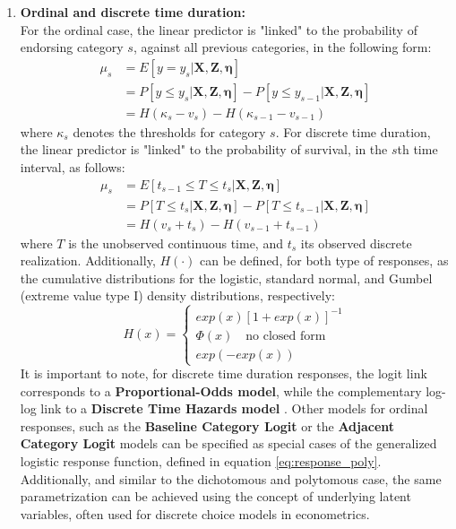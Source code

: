 \begin{enumerate}
	\item \textbf{Ordinal and discrete time duration:} \\
	For the ordinal case, the linear predictor is "linked" to the probability of endorsing category $s$, against all previous categories, in the following form:
	\begin{equation} \label{eq:link_ord1}
		\begin{split}
			\mu_{s} &= E[y = y_{s} | \mathbf{X}, \mathbf{Z}, \pmb{\eta}] \\
			&= P[y \leq y_{s} | \mathbf{X}, \mathbf{Z}, \pmb{\eta}] - P[y \leq y_{s-1} | \mathbf{X}, \mathbf{Z}, \pmb{\eta}] \\
			&= H(\kappa_{s} - v_{s}) - H(\kappa_{s-1} - v_{s-1})
		\end{split}
	\end{equation}
	where $\kappa_{s}$ denotes the thresholds for category $s$. For discrete time duration, the linear predictor is "linked" to the probability of survival, in the $s$th time interval, as follows:
	\begin{equation} \label{eq:link_ord2}
		\begin{split}
			\mu_{s} &= E[t_{s-1} \leq T \le t_{s} | \mathbf{X}, \mathbf{Z}, \pmb{\eta}] \\
			&= P[T \leq t_{s} | \mathbf{X}, \mathbf{Z}, \pmb{\eta}] - P[T \leq t_{s-1} | \mathbf{X}, \mathbf{Z}, \pmb{\eta}] \\
			&= H(v_{s} + t_{s}) - H(v_{s-1} + t_{s-1})
		\end{split}
	\end{equation}
	where $T$ is the unobserved continuous time, and $t_{s}$ its observed discrete realization. Additionally, $H(\cdot)$ can be defined, for both type of responses, as the cumulative distributions for the logistic, standard normal, and Gumbel (extreme value type I) density  distributions, respectively:
	\begin{equation} \label{eq:response_ord}
	H(x) = 
	\begin{cases}
		exp(x)[1 + exp(x)]^{-1} \\
		\Phi(x) \quad \text{no closed form} \\
		exp(-exp(x))
	\end{cases}
	\end{equation}
	It is important to note, for discrete time duration responses, the logit link corresponds to a \textbf{Proportional-Odds model}, while the complementary log-log link to a \textbf{Discrete Time Hazards model} \citep{Rabe_et_al_2001}. Other models for ordinal responses, such as the \textbf{Baseline Category Logit} or the \textbf{Adjacent Category Logit} models can be specified as special cases of the generalized logistic response function, defined in equation \ref{eq:response_poly}. Additionally, and similar to the dichotomous and polytomous case, the same parametrization can be achieved using the concept of underlying latent variables, often used for discrete choice models in econometrics.
	

\end{enumerate}
